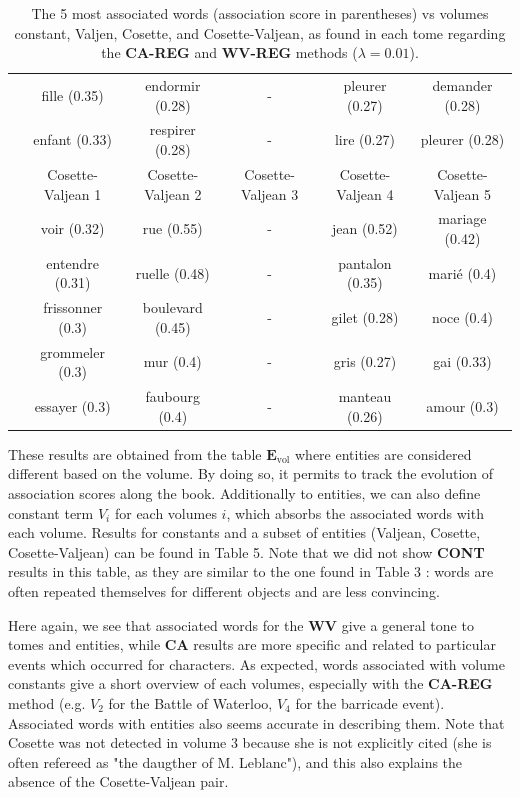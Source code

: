 \documentclass[
twocolumn,
]{ceurart}
\begin{document}
\begin{table}[!h]
\begin{tabular}{|c|c|c|c|c|c|}
		& fille (0.35) & endormir (0.28) & - & pleurer (0.27) & demander (0.28) \\
		& enfant (0.33) & respirer (0.28) & - & lire (0.27) & pleurer (0.28) \\
		\cline{2-6}
		& Cosette-Valjean 1 & Cosette-Valjean 2 & Cosette-Valjean 3 & Cosette-Valjean 4 & Cosette-Valjean 5 \\
		\cline{2-6}
		& voir (0.32) & rue (0.55) & - & jean (0.52) & mariage (0.42) \\ 
		& entendre (0.31) & ruelle (0.48) & - & pantalon (0.35) & marié (0.4) \\ 
		& frissonner (0.3) & boulevard (0.45) & - & gilet (0.28) & noce (0.4) \\ 
		& grommeler (0.3) & mur (0.4) & - & gris (0.27) & gai (0.33) \\ 
		& essayer (0.3) & faubourg (0.4) & - & manteau (0.26) & amour (0.3) \\ 
		\hline
	\end{tabular}
	\label{TIME_REG_word_vs_obj}
	\caption{The 5 most associated words (association score in parentheses) vs volumes constant, Valjen, Cosette, and Cosette-Valjean, as found in each tome regarding the \textbf{CA-REG} and \textbf{WV-REG} methods ($\lambda = 0.01$).}
\end{table}

These results are obtained from the table $\mathbf{E}_\text{vol}$ where entities are considered different based on the volume. By doing so, it permits to track the evolution of association scores along the book. Additionally to entities, we can also define constant term $V_i$ for each volumes $i$, which absorbs the associated words with each volume. Results for constants and a subset of entities (Valjean, Cosette, Cosette-Valjean) can be found in Table 5. Note that we did not show \textbf{CONT} results in this table, as they are similar to the one found in Table 3 : words are often repeated themselves for different objects and are less convincing. 

Here again, we see that associated words for the \textbf{WV} give a general tone to tomes and entities, while \textbf{CA} results are more specific and related to particular events which occurred for characters. As expected, words associated with volume constants give a short overview of each volumes, especially with the \textbf{CA-REG} method (e.g. $V_2$ for the Battle of Waterloo, $V_4$ for the barricade event). Associated words with entities also seems accurate in describing them. Note that Cosette was not detected in volume 3 because she is not explicitly cited (she is often refereed as "the daugther of M. Leblanc"), and this also explains the absence of the Cosette-Valjean pair. 
\end{document}

